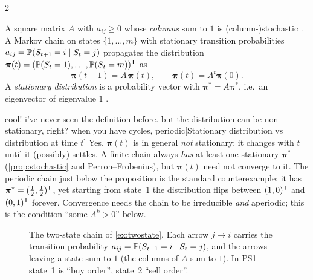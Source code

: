 \begin{paracol}{2}
\begin{definition}
A square matrix $A$ with $a_{ij}\ge0$ whose \emph{columns} sum to $1$ is (column-)stochastic
. A Markov chain on states $\{1,\dots,m\}$ with stationary transition probabilities
$a_{ij}=\mathbb{P}(S_{t+1}=i\mid S_t=j)$ propagates the distribution
$\bm\pi(t)=(\mathbb{P}(S_t=1),\dots,\mathbb{P}(S_t=m))^{\mathsf T}$ as
\[
  \bm\pi(t+1) = A\,\bm\pi(t),\qquad \bm\pi(t) = A^t\bm\pi(0).
\]
A \emph{stationary distribution} is a probability vector with $\bm\pi^*=A\bm\pi^*$, i.e.\ an
eigenvector of eigenvalue $1$ .
\end{definition}\begin{answer}{cool! i've never seen the definition before. but the distribution can be non stationary, right? when you have cycles, periodic}[Stationary distribution vs distribution at time $t$]
Yes. $\bm\pi(t)$ is in general \emph{not} stationary: it changes with $t$ until it (possibly)
settles. A finite chain always \emph{has} at least one stationary $\bm\pi^*$ (\cref{prop:stochastic} and
Perron--Frobenius), but $\bm\pi(t)$ need not converge to it. The periodic chain just below the
proposition is the standard counterexample: it has $\bm\pi^*=(\frac12,\frac12)^{\mathsf T}$, yet starting from
state~1 the distribution flips between $(1,0)^{\mathsf T}$ and $(0,1)^{\mathsf T}$ forever. Convergence needs the chain
to be irreducible \emph{and} aperiodic; this is the condition ``some $A^k>0$'' below.
\end{answer}
\begin{figure}[ht]
\centering
{}
\caption{The two-state chain of \cref{ex:twostate}. Each arrow $j\to i$ carries the transition
probability $a_{ij}=\mathbb{P}(S_{t+1}=i\mid S_t=j)$, and the arrows leaving a state sum to $1$ (the
columns of $A$ sum to $1$). In PS1 state~1 is ``buy order'', state~2 ``sell order''.}\label{fig:twostate}
\end{figure}


\end{paracol}
